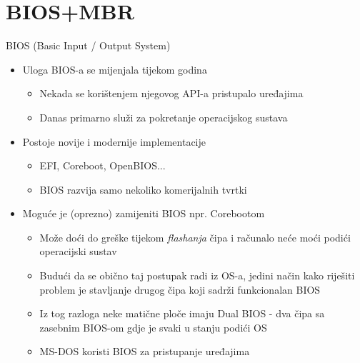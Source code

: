 \documentclass[croatian,t]{beamer} %
\begin{document}
    \section{BIOS+MBR}
    \begin{frame}{BIOS (Basic Input / Output System)}
    	\begin{itemize}
    		\item Uloga BIOS-a se mijenjala tijekom godina
    		\begin{itemize}
    			\item Nekada se korištenjem njegovog API-a pristupalo uređajima
    			\item Danas primarno služi za pokretanje operacijskog sustava
    		\end{itemize}
    		\item Postoje novije i modernije implementacije
    			\begin{itemize}
    				\item EFI, Coreboot, OpenBIOS...
    				\item BIOS razvija samo nekoliko komerijalnih tvrtki
    			\end{itemize}
    		\item Moguće je (oprezno) zamijeniti BIOS npr. Corebootom
    			\begin{itemize}
    				\item Može doći do greške tijekom \emph{flashanja} čipa i računalo neće moći podići operacijski sustav
    				\item Budući da se obično taj postupak radi iz OS-a, jedini način kako riješiti problem je stavljanje drugog čipa koji sadrži funkcionalan BIOS
    				\item Iz tog razloga neke matične ploče imaju Dual BIOS - dva čipa sa zasebnim BIOS-om gdje je svaki u stanju podići OS
    			\end{itemize}
    		\begin{itemize}
    			\item MS-DOS koristi BIOS za pristupanje uređajima
    		\end{itemize}
    	\end{itemize}
    \end{frame}
    
\end{document}
